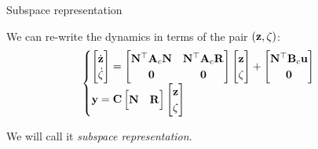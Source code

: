 \documentclass{beamer}
\begin{document}
\begin{frame}{Subspace representation}
	\begin{flushleft}
		
		We can re-write the dynamics in terms of the pair $(\mathbf{z}, \zeta)$:
		\begin{equation}
			\label{e_CLTI_z_zeta}
			\begin{cases}
				\begin{bmatrix}
					\dot{\mathbf{z}} \\ \dot{\zeta}
				\end{bmatrix} =
				\begin{bmatrix}
					\mathbf{N}^\top\mathbf{A}_c\mathbf{N} & \mathbf{N}^\top\mathbf{A}_c\mathbf{R}\\ 
					\mathbf{0} & \mathbf{0}
				\end{bmatrix}
				\begin{bmatrix}
					\mathbf{z} \\ \zeta
				\end{bmatrix}
				+
				\begin{bmatrix}
					\mathbf{N}^\top\mathbf{B}_c\mathbf{u} \\ \mathbf{0}
				\end{bmatrix} \\
				\mathbf{y} = \mathbf{C} 
				\begin{bmatrix}
					\mathbf{N} & \mathbf{R}
				\end{bmatrix}
				\begin{bmatrix}
					\mathbf{z} \\ \zeta
				\end{bmatrix}
			\end{cases}
		\end{equation}
		
		We will call it \emph{subspace representation}.
		
	\end{flushleft}
\end{frame}
\end{document}
